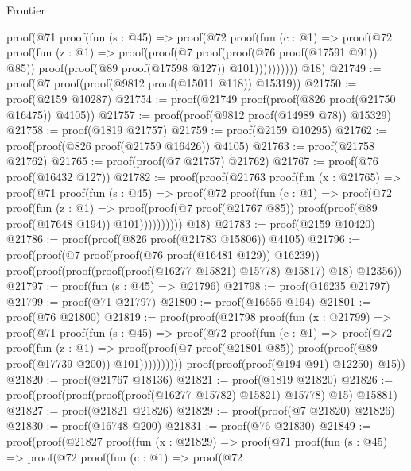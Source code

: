 \begin{lexlean}{Frontier}
\begin{coremodule}
          proof(@71
              proof(fun (s : @45) =>
                proof(@72
                    proof(fun (c : @1) =>
                      proof(@72
                          proof(fun (z : @1) =>
                            proof(proof(@7 proof(proof(@76 proof(@17591 @91)) @85))
                                proof(proof(@89 proof(@17598 @127)) @101))))))))))
      @18)
@21749 := proof(@7 proof(proof(@9812 proof(@15011 @118)) @15319))
@21750 := proof(@2159 @10287)
@21754 := proof(@21749 proof(proof(@826 proof(@21750 @16475)) @4105))
@21757 := proof(proof(@9812 proof(@14989 @78)) @15329)
@21758 := proof(@1819 @21757)
@21759 := proof(@2159 @10295)
@21762 := proof(proof(@826 proof(@21759 @16426)) @4105)
@21763 := proof(@21758 @21762)
@21765 := proof(proof(@7 @21757) @21762)
@21767 := proof(@76 proof(@16432 @127))
@21782 := proof(proof(@21763
        proof(fun (x : @21765) =>
          proof(@71
              proof(fun (s : @45) =>
                proof(@72
                    proof(fun (c : @1) =>
                      proof(@72
                          proof(fun (z : @1) =>
                            proof(proof(@7 proof(@21767 @85))
                                proof(proof(@89 proof(@17648 @194)) @101))))))))))
      @18)
@21783 := proof(@2159 @10420)
@21786 := proof(proof(@826 proof(@21783 @15806)) @4105)
@21796 := proof(proof(@7 proof(proof(@76 proof(@16481 @129)) @16239))
      proof(proof(proof(proof(proof(@16277 @15821) @15778) @15817) @18) @12356))
@21797 := proof(fun (s : @45) => @21796)
@21798 := proof(@16235 @21797)
@21799 := proof(@71 @21797)
@21800 := proof(@16656 @194)
@21801 := proof(@76 @21800)
@21819 := proof(proof(@21798
        proof(fun (x : @21799) =>
          proof(@71
              proof(fun (s : @45) =>
                proof(@72
                    proof(fun (c : @1) =>
                      proof(@72
                          proof(fun (z : @1) =>
                            proof(proof(@7 proof(@21801 @85))
                                proof(proof(@89 proof(@17739 @200)) @101))))))))))
      proof(proof(proof(@194 @91) @12250) @15))
@21820 := proof(@21767 @18136)
@21821 := proof(@1819 @21820)
@21826 := proof(proof(proof(proof(proof(@16277 @15782) @15821) @15778) @15) @15881)
@21827 := proof(@21821 @21826)
@21829 := proof(proof(@7 @21820) @21826)
@21830 := proof(@16748 @200)
@21831 := proof(@76 @21830)
@21849 := proof(proof(@21827
        proof(fun (x : @21829) =>
          proof(@71
              proof(fun (s : @45) =>
                proof(@72
                    proof(fun (c : @1) =>
                      proof(@72

\end{coremodule}
\end{lexlean}
